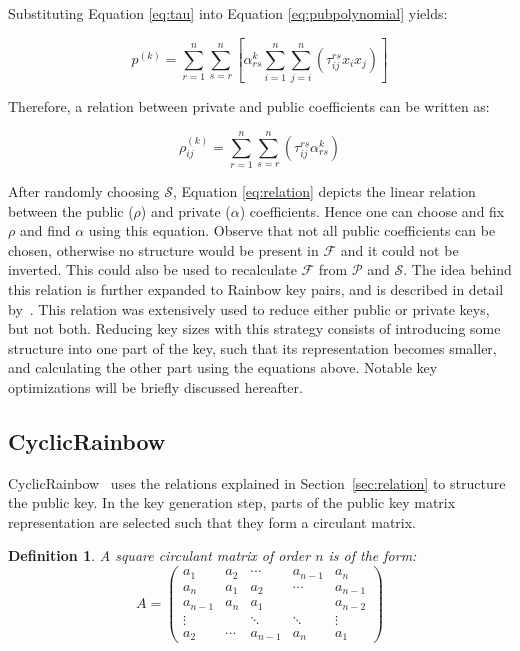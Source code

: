\documentclass{ufsctex/ufsctex}
\newtheorem{definition}{Definition}
\begin{document}
Substituting Equation \ref{eq:tau} into Equation \ref{eq:pubpolynomial} yields:

\begin{equation}
p^{(k)} = \sum_{r=1}^n \sum_{s=r}^n
\left[
\alpha^{k}_{rs} \sum_{i=1}^{n}\sum_{j=i}^n \left( \tau^{rs}_{ij} x_i x_j \right)
\right]
\end{equation}

Therefore, a relation between private and public coefficients can be written as:

\begin{equation}\label{eq:relation}
\rho^{(k)}_{ij} = \sum_{r=1}^{n}\sum_{s=r}^n
\left( \tau^{rs}_{ij} \alpha^{k}_{rs} \right)
\end{equation}

After randomly choosing $\mathcal{S}$, Equation \ref{eq:relation} depicts the
linear relation between the public ($\rho$) and private ($\alpha$)
coefficients. Hence one can choose and fix $\rho$ and find $\alpha$ using this
equation. Observe that not all public coefficients can be chosen, otherwise no
structure would be present in $\mathcal{F}$ and it could not be inverted. This
could also be used to recalculate $\mathcal{F}$ from $\mathcal{P}$ and
$\mathcal{S}$. The idea behind this relation is further expanded to Rainbow key
pairs, and is described in detail by~\cite{petzoldt2011small}. This relation
was extensively used to reduce either public or private keys, but not both.
Reducing key sizes with this strategy consists of introducing some structure
into one part of the key, such that its representation becomes smaller, and
calculating the other part using the equations above. Notable key optimizations
will be briefly discussed hereafter.

\subsection{CyclicRainbow}

CyclicRainbow~\cite{petzoldt2010cyclicrainbow} uses the relations explained in
Section~\ref{sec:relation} to structure the public key. In the key generation
step, parts of the public key matrix representation are selected such that they
form a circulant matrix.

\begin{definition}
A square circulant matrix of order $n$ is of the form:
\begin{equation}
A =
\begin{pmatrix}
a_1     & a_2    & \cdots  & a_{n-1} & a_n     \\
a_n     & a_1    & a_2     & \cdots  & a_{n-1} \\
a_{n-1} & a_n    & a_1     &         & a_{n-2} \\
\vdots  &        & \ddots  & \ddots  & \vdots  \\
a_2     & \cdots & a_{n-1} & a_n     & a_1
\end{pmatrix}
\end{equation}
\end{definition}
\end{document}
